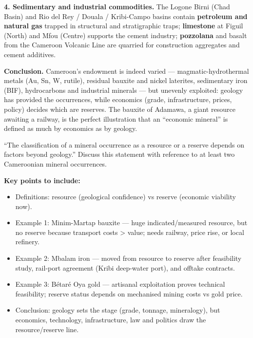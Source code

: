 \documentclass[11pt]{article}
\begin{document}
\begin{exoresolu}
\textbf{4. Sedimentary and industrial commodities.} The Logone Birni (Chad Basin) and Rio del Rey / Douala / Kribi-Campo basins contain \textbf{petroleum and natural gas} trapped in structural and stratigraphic traps; \textbf{limestone} at Figuil (North) and Mfou (Centre) supports the cement industry; \textbf{pozzolana} and basalt from the Cameroon Volcanic Line are quarried for construction aggregates and cement additives.

\textbf{Conclusion.} Cameroon's endowment is indeed varied — magmatic-hydrothermal metals (Au, Sn, W, rutile), residual bauxite and nickel laterites, sedimentary iron (BIF), hydrocarbons and industrial minerals — but unevenly exploited: geology has provided the occurrences, while economics (grade, infrastructure, prices, policy) decides which are reserves. The bauxite of Adamawa, a giant resource awaiting a railway, is the perfect illustration that an ``economic mineral'' is defined as much by economics as by geology.
\end{exoresolu}

\begin{exercice}
``The classification of a mineral occurrence as a resource or a reserve depends on factors beyond geology.'' Discuss this statement with reference to at least two Cameroonian mineral occurrences.
\end{exercice}

\begin{corrige}
\textbf{Key points to include:}
\begin{itemize}
\item Definitions: resource (geological confidence) vs reserve (economic viability now).
\item Example 1: Minim-Martap bauxite — huge indicated/measured resource, but no reserve because transport costs > value; needs railway, price rise, or local refinery.
\item Example 2: Mbalam iron — moved from resource to reserve after feasibility study, rail-port agreement (Kribi deep-water port), and offtake contracts.
\item Example 3: B\'etar\'e Oya gold — artisanal exploitation proves technical feasibility; reserve status depends on mechanised mining costs vs gold price.
\item Conclusion: geology sets the stage (grade, tonnage, mineralogy), but economics, technology, infrastructure, law and politics draw the resource/reserve line.
\end{itemize}
\end{corrige}
\end{document}

